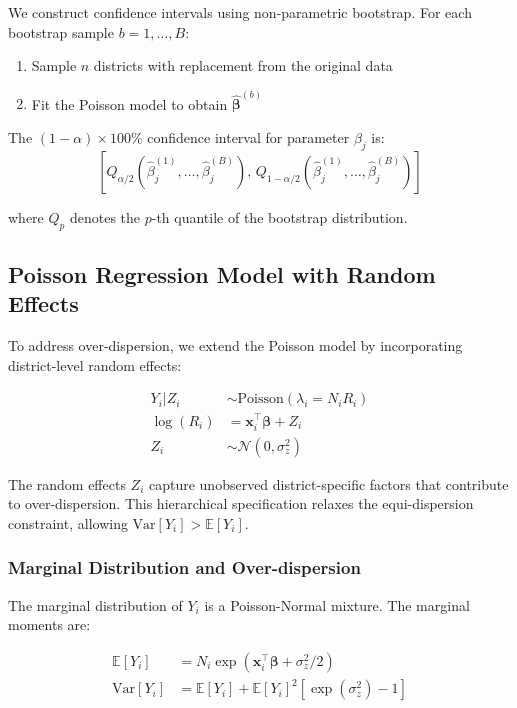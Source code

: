 \documentclass[11pt]{article}
\begin{document}
We construct confidence intervals using non-parametric bootstrap. For each bootstrap sample $b = 1, \ldots, B$:
\begin{enumerate}
\item Sample $n$ districts with replacement from the original data
\item Fit the Poisson model to obtain $\hat{\boldsymbol{\beta}}^{(b)}$
\end{enumerate}

The $(1-\alpha) \times 100\%$ confidence interval for parameter $\beta_j$ is:
\begin{equation}
\left[ Q_{\alpha/2}(\hat{\beta}_j^{(1)}, \ldots, \hat{\beta}_j^{(B)}), \, Q_{1-\alpha/2}(\hat{\beta}_j^{(1)}, \ldots, \hat{\beta}_j^{(B)}) \right]
\end{equation}

where $Q_p$ denotes the $p$-th quantile of the bootstrap distribution.

\subsection{Poisson Regression Model with Random Effects}

To address over-dispersion, we extend the Poisson model by incorporating district-level random effects:

\begin{align}
Y_i | Z_i &\sim \text{Poisson}(\lambda_i = N_i R_i) \\
\log(R_i) &= \mathbf{x}_i^\top \boldsymbol{\beta} + Z_i \\
Z_i &\sim \mathcal{N}(0, \sigma_z^2)
\end{align}

The random effects $Z_i$ capture unobserved district-specific factors that contribute to over-dispersion. This hierarchical specification relaxes the equi-dispersion constraint, allowing $\text{Var}[Y_i] > \mathbb{E}[Y_i]$.

\subsubsection{Marginal Distribution and Over-dispersion}

The marginal distribution of $Y_i$ is a Poisson-Normal mixture. The marginal moments are:

\begin{align}
\mathbb{E}[Y_i] &= N_i \exp(\mathbf{x}_i^\top \boldsymbol{\beta} + \sigma_z^2/2) \\
\text{Var}[Y_i] &= \mathbb{E}[Y_i] + \mathbb{E}[Y_i]^2 \left[ \exp(\sigma_z^2) - 1 \right]
\end{align}
\end{document}
